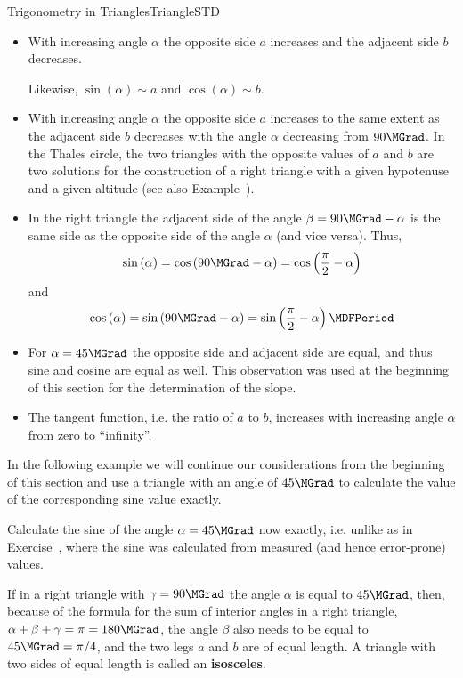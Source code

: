 \begin{MXContent}{Trigonometry in Triangles}{Triangle}{STD}
\begin{itemize}
\item With increasing angle $\alpha$ the opposite side $a$ increases and 
the adjacent side $b$ decreases.

Likewise, $\sin\left(\alpha\right)\sim a$ and 
$\cos\left(\alpha\right)\sim b$.

\item With increasing angle $\alpha$ the opposite side $a$ increases 
to the same extent as the adjacent side $b$ decreases with the angle $\alpha$
decreasing from $90\MGrad$. In the Thales circle, the two triangles 
with the opposite values of $a$ and $b$ are two solutions for 
the construction of a right triangle with a given hypotenuse and a given 
altitude (see also Example~).

\item In the right triangle the adjacent side of the angle $\beta = 90\MGrad - \alpha$ is 
the same side as the opposite side of the angle $\alpha$
(and vice versa). Thus, 
\[
\sin\left(\alpha\right)=\cos\left(90\MGrad-\alpha\right) %
 = \cos\left(\frac{\pi}{2}-\alpha\right) %
\]
and 
\[
\cos\left(\alpha\right) = \sin\left(90\MGrad-\alpha\right) %
 = \sin\left(\frac{\pi}{2}-\alpha\right) \MDFPeriod %
\]
%
\item For $\alpha=45\MGrad$ the opposite side and adjacent side are equal, and thus sine and 
cosine are equal as well. This observation was used at the beginning of this 
section for the determination of the slope.

\item The tangent function, i.e. the ratio of $a$ to $b$, increases with increasing 
angle $\alpha$ from zero to ``infinity''. 
\end{itemize}

In the following example we will continue our considerations from the beginning of this 
section and use a triangle with an angle of $45\MGrad$ to calculate the value 
of the corresponding sine value exactly.

\begin{MExample}
Calculate the sine of the angle $\alpha=45\MGrad$ now exactly, i.e. unlike as in 
Exercise~, where the sine was calculated from 
measured (and hence error-prone) values.

If in a right triangle with $\gamma=90\MGrad$ the angle $\alpha$ is equal to $45\MGrad$, then, 
because of the formula for the sum of interior angles in a right triangle, $\alpha+\beta+\gamma=\pi=180\MGrad$,  
the angle $\beta$ also needs to be equal to $45\MGrad=\pi/4$, and the two legs $a$ and $b$ are 
of equal length. A triangle with two sides of equal length is called an \textbf{isosceles}.


\end{MExample}
\end{MXContent}

